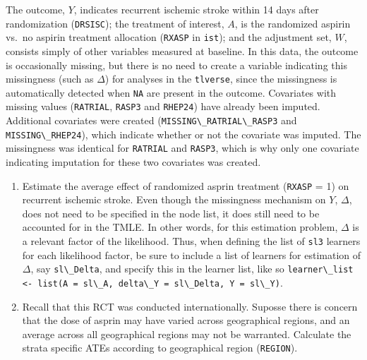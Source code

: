 \documentclass[
  12pt, krantz2,
]{book}
\newcommand{\passthrough}[1]{#1}
\providecommand{\tightlist}{%
  \setlength{\itemsep}{0pt}\setlength{\parskip}{0pt}}
\theoremstyle{definition}
\theoremstyle{definition}
\theoremstyle{definition}
\newcommand{\1}{\mathbbm{1}}
\begin{document}
The outcome, \(Y\), indicates recurrent ischemic stroke within 14 days after
randomization (\passthrough{\lstinline!DRSISC!}); the treatment of interest, \(A\), is the randomized
aspirin vs.~no aspirin treatment allocation (\passthrough{\lstinline!RXASP!} in \passthrough{\lstinline!ist!}); and the
adjustment set, \(W\), consists simply of other variables measured at baseline. In
this data, the outcome is occasionally missing, but there is no need to create a
variable indicating this missingness (such as \(\Delta\)) for analyses in the
\passthrough{\lstinline!tlverse!}, since the missingness is automatically detected when \passthrough{\lstinline!NA!} are present
in the outcome. Covariates with missing values (\passthrough{\lstinline!RATRIAL!}, \passthrough{\lstinline!RASP3!} and \passthrough{\lstinline!RHEP24!})
have already been imputed. Additional covariates were created
(\passthrough{\lstinline!MISSING\_RATRIAL\_RASP3!} and \passthrough{\lstinline!MISSING\_RHEP24!}), which indicate whether or not
the covariate was imputed. The missingness was identical for \passthrough{\lstinline!RATRIAL!} and
\passthrough{\lstinline!RASP3!}, which is why only one covariate indicating imputation for these two
covariates was created.

\begin{enumerate}
\def\labelenumi{\arabic{enumi}.}
\tightlist
\item
  Estimate the average effect of randomized asprin treatment (\passthrough{\lstinline!RXASP!} = 1) on
  recurrent ischemic stroke. Even though the missingness mechanism on \(Y\),
  \(\Delta\), does not need to be specified in the node list, it does still need
  to be accounted for in the TMLE. In other words, for this estimation problem,
  \(\Delta\) is a relevant factor of the likelihood. Thus, when defining the
  list of \passthrough{\lstinline!sl3!} learners for each likelihood factor, be sure to include a list
  of learners for estimation of \(\Delta\), say \passthrough{\lstinline!sl\_Delta!}, and specify this in
  the learner list, like so
  \passthrough{\lstinline!learner\_list <- list(A = sl\_A, delta\_Y = sl\_Delta, Y = sl\_Y)!}.
\item
  Recall that this RCT was conducted internationally. Suposse there is concern
  that the dose of asprin may have varied across geographical regions, and an
  average across all geographical regions may not be warranted. Calculate the
  strata specific ATEs according to geographical region (\passthrough{\lstinline!REGION!}).
\end{enumerate}
\end{document}
